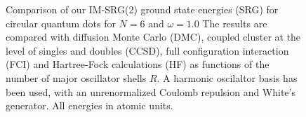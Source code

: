 \documentclass[amsmath, amssymb, aps, floatfix, nofootinbib, preprintnumbers,showpacs, superscriptaddress, twocolumn]{revtex4-1}
\begin{document}
\begin{figure}
\begin{center}
{        }
    \end{center}
    \caption{Comparison of our IM-SRG(2) ground state energies (SRG)
      for circular quantum dots for $N=6$ and $\omega=1.0$
       The results are compared with diffusion Monte Carlo (DMC),
      coupled cluster at the level of singles and doubles (CCSD), full
      configuration interaction (FCI) and Hartree-Fock calculations
      (HF) as functions of the number of major oscillator shells
      $R$. A harmonic oscilaltor basis has been used, with an
      unrenormalized Coulomb repulsion and White's generator. All
      energies in atomic units.}
   \label{fig:N6}
\end{figure}





\begin{figure}%
     \begin{center}
        \\ %
\end{center}
\end{figure}
\end{document}
